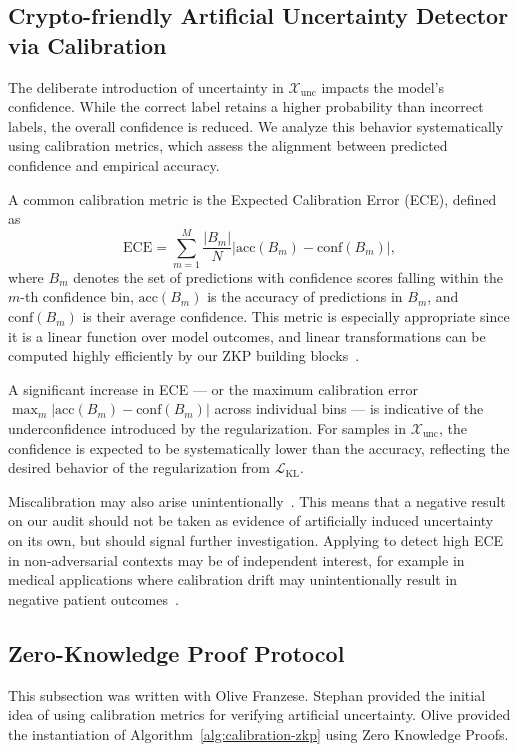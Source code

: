 \subsection{Crypto-friendly Artificial Uncertainty Detector via Calibration}

The deliberate introduction of uncertainty in \(\mathcal{X}_\text{unc}\) impacts the model's confidence. While the correct label retains a higher probability than incorrect labels, the overall confidence is reduced. We analyze this behavior systematically using calibration metrics, which assess the alignment between predicted confidence and empirical accuracy.

A common calibration metric is the Expected Calibration Error (ECE), defined as
\begin{equation}
    \text{ECE} = \sum_{m=1}^M \frac{|B_m|}{N} \left| \text{acc}(B_m) - \text{conf}(B_m) \right|,
\end{equation}
where \(B_m\) denotes the set of predictions with confidence scores falling within the \(m\)-th confidence bin, \(\text{acc}(B_m)\) is the accuracy of predictions in \(B_m\), and \(\text{conf}(B_m)\) is their average confidence. This metric is especially appropriate since it is a linear function over model outcomes, and linear transformations can be computed highly efficiently by our ZKP building blocks~\cite{weng2021wolverine}.

A significant increase in ECE --- or the maximum calibration error $\max_{m}\left| \text{acc}(B_m) - \text{conf}(B_m) \right|$ across individual bins --- is indicative of the underconfidence introduced by the regularization. For samples in \(\mathcal{X}_\text{unc}\), the confidence is expected to be systematically lower than the accuracy, reflecting the desired behavior of the regularization from \(\mathcal{L}_\text{KL}\).

Miscalibration may also arise unintentionally~\cite{niculescu2005predicting}. This means that a negative result on our audit should not be taken as evidence of artificially induced uncertainty on its own, but should signal further investigation. Applying \name to detect high ECE in non-adversarial contexts may be of independent interest, for example in medical applications where calibration drift may unintentionally result in negative patient outcomes~\cite{kore2024drift}.

\subsection{Zero-Knowledge Proof Protocol}
\begin{contriback}
This subsection was written with Olive Franzese. Stephan provided the initial idea of using calibration metrics for verifying artificial uncertainty. Olive provided the instantiation of Algorithm~\ref{alg:calibration-zkp} using Zero Knowledge Proofs.
\end{contriback}

